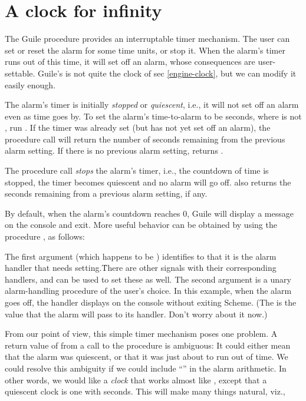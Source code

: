 \chapter{A clock for infinity}
\label{clock}

The Guile \cite{guile} procedure  provides an interruptable
timer mechanism.  The user can set or reset the alarm
for some time units, or stop it.  When the alarm’s
timer runs out of this time, it will set off an alarm,
whose consequences are user-settable.  Guile’s
 is not quite the clock of
sec \ref{engine-clock}, but we can modify it easily
enough.

The alarm’s timer is initially {\em stopped} or {\em
quiescent}, i.e., it will not set off an alarm even as
time goes by.  To set the alarm’s time-to-alarm to be
 seconds, where  is not , run .  If the timer was already set (but has not yet set
off an alarm), the  procedure call will
return the number of seconds remaining from the
previous alarm setting.  If there is no previous alarm
setting,  returns .

The procedure call  {\em stops} the
alarm’s timer, i.e., the countdown of time is stopped,
the timer becomes quiescent and no alarm will go off.
 also returns the seconds remaining from a
previous alarm setting, if any.

By default, when the alarm’s countdown reaches 0,
Guile will display a message on the console and exit.
More useful behavior can be obtained by
using the procedure
, as follows:


\n
The first argument  (which happens to be
) identifies to  that it is the
alarm handler that needs setting.\f{There are other
signals with their corresponding handlers, and
 can be used to set these as well.}  The
second argument is a unary alarm-handling procedure of
the user’s choice.  In this example, when the alarm
goes off, the handler displays  on the console without exiting Scheme.
(The  is the  value that the alarm
will pass to its handler.  Don’t worry about it now.)

From our point of view, this simple timer mechanism
poses one problem.  A return value of  from a call
to the procedure  is ambiguous: It could
either mean that the alarm was quiescent, or that 
it was just about to run out of time.  We could resolve
this ambiguity if we could include “”
in the alarm arithmetic.  In other words, we would like
a {\em clock} that works almost like ,
except that a quiescent clock is one with
 seconds.  This will make many things
natural, viz.,

